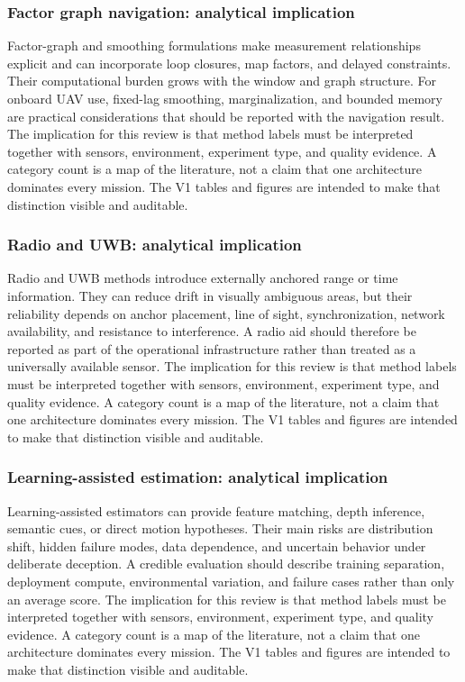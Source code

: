 \documentclass[
  journal,
  10pt]{IEEEtran}
\begin{document}
\subsubsection{Factor graph navigation: analytical
implication}\label{factor-graph-navigation-analytical-implication-2}

Factor-graph and smoothing formulations make measurement relationships
explicit and can incorporate loop closures, map factors, and delayed
constraints. Their computational burden grows with the window and graph
structure. For onboard UAV use, fixed-lag smoothing, marginalization,
and bounded memory are practical considerations that should be reported
with the navigation result. The implication for this review is that
method labels must be interpreted together with sensors, environment,
experiment type, and quality evidence. A category count is a map of the
literature, not a claim that one architecture dominates every mission.
The V1 tables and figures are intended to make that distinction visible
and auditable.

\subsubsection{Radio and UWB: analytical
implication}\label{radio-and-uwb-analytical-implication-2}

Radio and UWB methods introduce externally anchored range or time
information. They can reduce drift in visually ambiguous areas, but
their reliability depends on anchor placement, line of sight,
synchronization, network availability, and resistance to interference. A
radio aid should therefore be reported as part of the operational
infrastructure rather than treated as a universally available sensor.
The implication for this review is that method labels must be
interpreted together with sensors, environment, experiment type, and
quality evidence. A category count is a map of the literature, not a
claim that one architecture dominates every mission. The V1 tables and
figures are intended to make that distinction visible and auditable.

\subsubsection{Learning-assisted estimation: analytical
implication}\label{learning-assisted-estimation-analytical-implication-2}

Learning-assisted estimators can provide feature matching, depth
inference, semantic cues, or direct motion hypotheses. Their main risks
are distribution shift, hidden failure modes, data dependence, and
uncertain behavior under deliberate deception. A credible evaluation
should describe training separation, deployment compute, environmental
variation, and failure cases rather than only an average score. The
implication for this review is that method labels must be interpreted
together with sensors, environment, experiment type, and quality
evidence. A category count is a map of the literature, not a claim that
one architecture dominates every mission. The V1 tables and figures are
intended to make that distinction visible and auditable.
\end{document}
